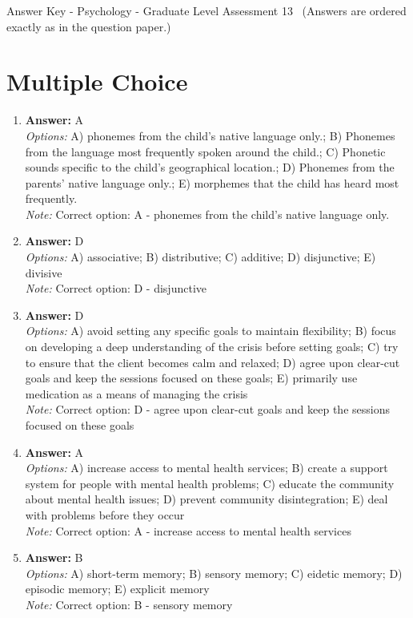\documentclass[12pt]{article}
\begin{document}
\begin{center}
Answer Key - Psychology - Graduate Level Assessment 13 \
\small (Answers are ordered exactly as in the question paper.)
\end{center}

\section*{Multiple Choice}
\begin{enumerate}[label=\arabic*.]
\item \textbf{Answer:} A
\\ \textit{Options:} A) phonemes from the child's native language only.; B) Phonemes from the language most frequently spoken around the child.; C) Phonetic sounds specific to the child's geographical location.; D) Phonemes from the parents' native language only.; E) morphemes that the child has heard most frequently.
\\ \textit{Note:} Correct option: A - phonemes from the child's native language only.
\item \textbf{Answer:} D
\\ \textit{Options:} A) associative; B) distributive; C) additive; D) disjunctive; E) divisive
\\ \textit{Note:} Correct option: D - disjunctive
\item \textbf{Answer:} D
\\ \textit{Options:} A) avoid setting any specific goals to maintain flexibility; B) focus on developing a deep understanding of the crisis before setting goals; C) try to ensure that the client becomes calm and relaxed; D) agree upon clear-cut goals and keep the sessions focused on these goals; E) primarily use medication as a means of managing the crisis
\\ \textit{Note:} Correct option: D - agree upon clear-cut goals and keep the sessions focused on these goals
\item \textbf{Answer:} A
\\ \textit{Options:} A) increase access to mental health services; B) create a support system for people with mental health problems; C) educate the community about mental health issues; D) prevent community disintegration; E) deal with problems before they occur
\\ \textit{Note:} Correct option: A - increase access to mental health services
\item \textbf{Answer:} B
\\ \textit{Options:} A) short-term memory; B) sensory memory; C) eidetic memory; D) episodic memory; E) explicit memory
\\ \textit{Note:} Correct option: B - sensory memory
\end{enumerate}
\end{document}
